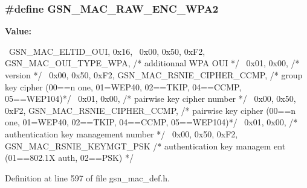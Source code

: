 \hypertarget{a00522_a83bb49946fc9d9f022e614c8880f2527}{
\subsubsection[{GSN\_\-MAC\_\-RAW\_\-ENC\_\-WPA2}]{\setlength{\rightskip}{0pt plus 5cm}\#define GSN\_\-MAC\_\-RAW\_\-ENC\_\-WPA2}}
\label{a00522_a83bb49946fc9d9f022e614c8880f2527}
{\bfseries Value:}
\begin{DoxyCode}
{{                                                                               
      \
    GSN_MAC_ELTID_OUI, 0x16,                                                     
          \
    0x00, 0x50, 0xF2, GSN_MAC_OUI_TYPE_WPA,         /* additionnal WPA OUI       
                                                    */ \
    0x01, 0x00,                                 /* version                       
                                                */ \
    0x00, 0x50, 0xF2, GSN_MAC_RSNIE_CIPHER_CCMP,    /* group key cipher    (00==n
      one, 01=WEP40, 02==TKIP, 04==CCMP, 05==WEP104)*/ \
    0x01, 0x00,                                 /* pairwise key cipher number    
                                                */ \
    0x00, 0x50, 0xF2, GSN_MAC_RSNIE_CIPHER_CCMP,    /* pairwise key cipher (00==n
      one, 01=WEP40, 02==TKIP, 04==CCMP, 05==WEP104)*/ \
    0x01, 0x00,                                 /* authentication key management 
      number                                    */ \
    0x00, 0x50, 0xF2, GSN_MAC_RSNIE_KEYMGT_PSK      /* authentication key managem
      ent (01==802.1X auth, 02==PSK)                */ \
}}
\end{DoxyCode}


Definition at line 597 of file gsn\_\-mac\_\-def.h.

